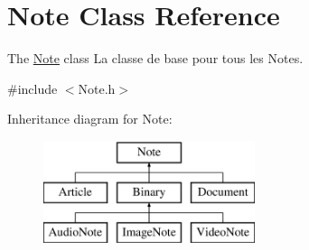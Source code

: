 \hypertarget{class_note}{\section{Note Class Reference}
\label{class_note}
}


The \hyperlink{class_note}{Note} class La classe de base pour tous les Notes.  




{\ttfamily \#include $<$Note.\-h$>$}

Inheritance diagram for Note\-:\begin{figure}[H]
\begin{center}
\leavevmode
\includegraphics[height=3.000000cm]{class_note}
\end{center}
\end{figure}
